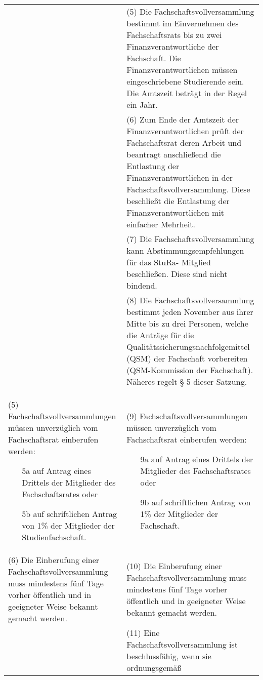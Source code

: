 {\begin{longtable}{|p{7.5cm}|p{7.5cm}|}
        &
        (5) Die Fachschaftsvollversammlung bestimmt im Einvernehmen des Fachschaftsrats bis
        zu zwei Finanzverantwortliche der Fachschaft. Die Finanzverantwortlichen müssen
        eingeschriebene Studierende sein. Die Amtszeit beträgt in der Regel ein Jahr. \\
        &
        (6) Zum Ende der Amtszeit der Finanzverantwortlichen prüft der Fachschaftsrat deren
        Arbeit und beantragt anschließend die Entlastung der Finanzverantwortlichen in der
        Fachschaftsvollversammlung. Diese beschließt die Entlastung der
        Finanzverantwortlichen mit einfacher Mehrheit.\\
        &(7) Die Fachschaftsvollversammlung kann Abstimmungsempfehlungen für das StuRa-
        Mitglied beschließen. Diese sind nicht bindend.\\
        &(8) Die Fachschaftsvollversammlung bestimmt jeden November aus ihrer Mitte bis zu
        drei Personen, welche die Anträge für die Qualitätssicherungsnachfolgemittel (QSM)
        der Fachschaft vorbereiten (QSM-Kommission der Fachschaft). Näheres regelt § 5 dieser
        Satzung.\\
        (5)  Fachschaftsvollversammlungen müssen unverzüglich vom Fachschaftsrat
        einberufen werden:
        \begin{itemize}
        \item[5a]auf Antrag eines Drittels der Mitglieder des Fachschaftsrates oder
        \item[5b]auf schriftlichen Antrag von 1\% der Mitglieder der Studienfachschaft. 
        \end{itemize}&(9)  Fachschaftsvollversammlungen müssen unverzüglich vom Fachschaftsrat einberufen
        werden:
        \begin{itemize}
        \item[9a] auf Antrag eines Drittels der Mitglieder des Fachschaftsrates oder
        \item[9b] auf schriftlichen Antrag von 1\% der Mitglieder der Fachschaft. 
        \end{itemize}\\
        (6) Die Einberufung einer Fachschaftsvollversammlung muss mindestens fünf Tage
        vorher öffentlich und in geeigneter Weise bekannt gemacht werden.&
        (10) Die Einberufung einer Fachschaftsvollversammlung muss mindestens fünf Tage
        vorher öffentlich und in geeigneter Weise bekannt gemacht werden.\\
        &(11) Eine Fachschaftsvollversammlung ist beschlussfähig, wenn sie ordnungsgemäß

\end{longtable}}
